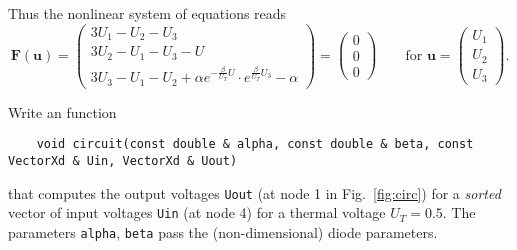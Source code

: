 \begin{problem}
\begin{subproblem}[2]
\begin{solution}
    Thus the nonlinear system of equations reads
    $$\mathbf{F}(\mathbf{u})=\left(\begin{array}{l}3U_1-U_2-U_3 \\ 3U_2-U_1-U_3-U \\ 
      3U_3-U_1-U_2 +\alpha e^{-\frac{\beta}{U_T}U}\cdot e^{\frac{\beta}{U_T}U_3} -\alpha \end{array}\right)=
      \left(\begin{array}{c} 0 \\0\\ 0\end{array}\right) \qquad \text{for } \mathbf{u}=\left(\begin{array}{c}U_1 \\ U_2 \\ U_3 \end{array}\right). $$
    \end{solution}
  \end{subproblem}

  \begin{subproblem}[3]
    Write an \Eigen{} function 
    \begin{lstlisting}
    void circuit(const double & alpha, const double & beta, const VectorXd & Uin, VectorXd & Uout)
    \end{lstlisting}
    that computes the output voltages \texttt{Uout} (at node 1 in Fig.~\ref{fig:circ}) for a
    \emph{sorted} vector of input voltages \texttt{Uin} (at node 4) for a thermal voltage $U_T=0.5$. The
    parameters \texttt{alpha}, \texttt{beta} pass the (non-dimensional) diode
    parameters. 


\end{subproblem}
\end{problem}
